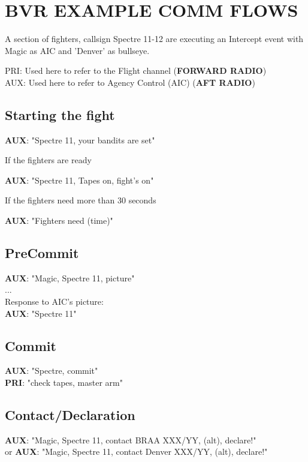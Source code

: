 \section{BVR EXAMPLE COMM FLOWS}

A section of fighters, callsign Spectre 11-12 are executing an Intercept event
with Magic as AIC and 'Denver' as bullseye.

{\color{red}PRI}: Used here to refer to the Flight channel (\textbf{FORWARD
RADIO}) \\
{\color{red}AUX}: Used here to refer to Agency Control (AIC) (\textbf{AFT
RADIO})

\subsection*{Starting the fight}

\textbf{AUX}: "Spectre 11, your bandits are set"

If the fighters are ready

\textbf{AUX}: "Spectre 11, Tapes on, fight's on"

If the fighters need more than 30 seconds

\textbf{AUX}: "Fighters need (time)"

\subsection*{PreCommit}

\textbf{AUX}: "Magic, Spectre 11, picture"\\
...\\
Response to AIC's picture:\\
\textbf{AUX}: "Spectre 11"

\subsection*{Commit}

\textbf{AUX}: "Spectre, commit"\\
\textbf{PRI}: "check tapes, master arm"

\subsection{Contact/Declaration}

\textbf{AUX}: "Magic, Spectre 11, contact BRAA XXX/YY, (alt), declare!"\\
or
\textbf{AUX}: "Magic, Spectre 11, contact Denver XXX/YY, (alt), declare!"

